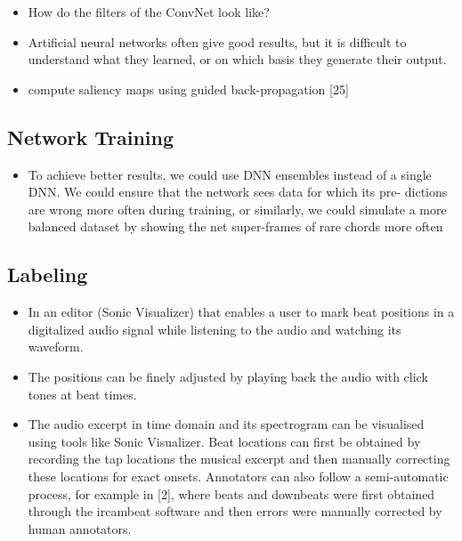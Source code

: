 \documentclass{scrartcl}
\begin{document}
\begin{itemize}
\item How do the filters of the ConvNet look like?
\item Artificial neural networks often give good results, but it is difficult to understand what they learned, or on which basis they generate their output.
\item compute saliency maps using guided back-propagation [25]
\end{itemize}



\subsection{Network Training}

\begin{itemize}
\item To achieve better results, we could use DNN ensembles instead of a single DNN. We could ensure that the network sees data for which its pre- dictions are wrong more often during training, or similarly, we could simulate a more balanced dataset by showing the net super-frames of rare chords more often \cite{Korzeniowski2016}
\end{itemize}



\subsection{Labeling}

\begin{itemize}
\item In an editor (Sonic Visualizer) that enables a user to mark beat positions in a digitalized audio signal while listening to the audio and watching its waveform.
\item The positions can be finely adjusted by playing back the audio with click tones at beat times.
\item The audio excerpt in time domain and its spectrogram can be visualised using tools like Sonic Visualizer. Beat locations can first be obtained by recording the tap locations the musical excerpt and then manually correcting these locations for exact onsets.  Annotators can also follow a semi-automatic process, for example in [2], where beats and downbeats were first obtained through the ircambeat software and then errors were manually corrected by human annotators.
\end{itemize}
\end{document}
